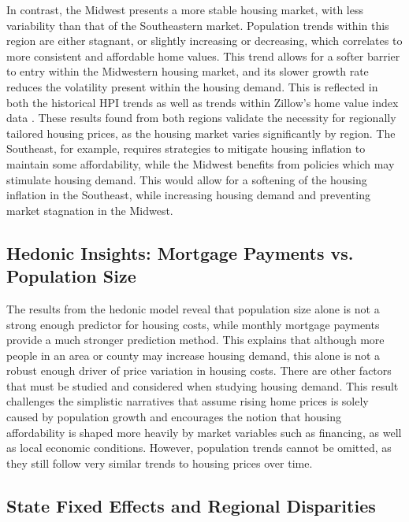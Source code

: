 \documentclass[journal,article,submit,pdftex,moreauthors]{Definitions/mdpi}
\begin{document}
In contrast, the Midwest presents a more stable housing market, with less variability than that of the Southeastern market. Population trends within this region are either stagnant, or slightly increasing or decreasing, which correlates to more consistent and affordable home values. This trend allows for a softer barrier to entry within the Midwestern housing market, and its slower growth rate reduces the volatility present within the housing demand. This is reflected in both the historical HPI trends as well as trends within Zillow’s home value index data \citep{zillow_2024_housing}. These results found from both regions validate the necessity for regionally tailored housing prices, as the housing market varies significantly by region. The Southeast, for example, requires strategies to mitigate housing inflation to maintain some affordability, while the Midwest benefits from policies which may stimulate housing demand. This would allow for a softening of the housing inflation in the Southeast, while increasing housing demand and preventing market stagnation in the Midwest.

\subsection{Hedonic Insights: Mortgage Payments vs. Population Size}

The results from the hedonic model reveal that population size alone is not a strong enough predictor for housing costs, while monthly mortgage payments provide a much stronger prediction method. This explains that although more people in an area or county may increase housing demand, this alone is not a robust enough driver of price variation in housing costs. There are other factors that must be studied and considered when studying housing demand. This result challenges the simplistic narratives that assume rising home prices is solely caused by population growth and encourages the notion that housing affordability is shaped more heavily by market variables such as financing, as well as local economic conditions. However, population trends cannot be omitted, as they still follow very similar trends to housing prices over time.


\subsection{State Fixed Effects and Regional Disparities}
\end{document}
